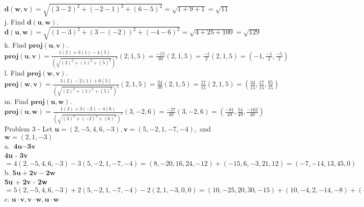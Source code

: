 \documentclass[11pt]{article}
\begin{document}
$
\mathbf{d(w,v)}
= \sqrt{(3-2)^2 + (-2-1)^2 + (6-5)^2}
= \sqrt{1 + 9 + 1}
= \sqrt{11}
$ \\[5pt]

j. Find $\mathbf{d(u,w)}$. \\[5pt]

$
\mathbf{d(u,w)}
= \sqrt{(1-3)^2 + (3-(-2))^2 + (-4-6)^2}
= \sqrt{4 + 25 + 100}
= \sqrt{129}
$ \\[5pt]

k. Find $\mathbf{proj(u,v)}$. \\[5pt]

$
\mathbf{proj(u,v)}
= \frac{1(2)+3(1)-4(5)}{\left(\sqrt{(2)^2+(1)^2+(5)^2}\right)^2}(2,1,5)
= \frac{-15}{30}(2,1,5)
= \frac{-1}{2}(2,1,5)
= (-1,\frac{-1}{2},\frac{-5}{2})
$ \\[5pt]

l. Find $\mathbf{proj(w,v)}$. \\[5pt]

$
\mathbf{proj(w,v)}
= \frac{3(2)-2(1)+6(5)}{\left(\sqrt{(2)^2+(1)^2+(5)^2}\right)^2}(2,1,5)
= \frac{34}{30}(2,1,5)
= \frac{17}{15}(2,1,5)
= (\frac{34}{15},\frac{17}{15},\frac{85}{15})
$ \\[5pt]

m. Find $\mathbf{proj(u,w)}$. \\[5pt]

$
\mathbf{proj(u,w)}
= \frac{1(3)+3(-2)-4(6)}{\left(\sqrt{(3)^2+(-2)^2+(6)^2}\right)^2}(3,-2,6)
= \frac{-27}{49}(3,-2,6)
= (\frac{-81}{49},\frac{54}{49},\frac{-162}{49})
$ \\[5pt]

Problem 3 - Let $\mathbf{u} =(2,-5,4,6,-3),\mathbf{v}=(5,-2,1,-7,-4),$ and $\mathbf{w}=(2,1,-3)$ \\[5pt]

a. $\textbf{4u} - \textbf{3v}$ \\[5pt]

$
$\textbf{4u} - \textbf{3v}$
= 4(2,-5,4,6,-3) - 3(5,-2,1,-7,-4)
= (8,-20,16,24,-12) + (-15,6,-3,21,12)
= (-7,-14,13,45,0)
$ \\[5pt]

b. $\textbf{5u} + \textbf{2v} - \textbf{2w}$ \\[5pt]

$
$\textbf{5u} + \textbf{2v} - \textbf{2w}$
= 5(2,-5,4,6,-3) + 2(5,-2,1,-7,-4) - 2(2,1,-3,0,0)
= (10,-25,20,30,-15) + (10,-4,2,-14,-8) + (-4,-2,6,0,0)
= (16,-31,28,16,-23)
$ \\[5pt]

c. $\textbf{u}\cdot\textbf{v}, \textbf{v}\cdot\textbf{w}, \textbf{u}\cdot\textbf{w}$ \\ [5pt]
\end{document}
